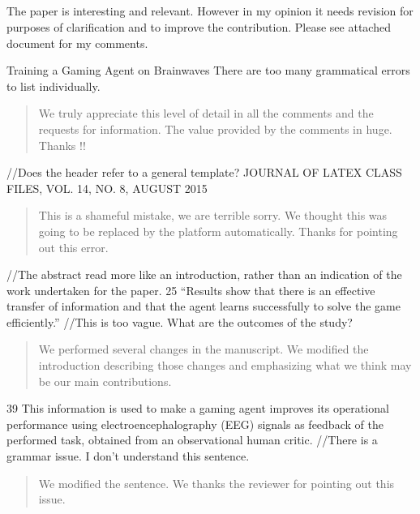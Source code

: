 \documentclass[journal,onecolumn,12pt]{IEEEtran}
\begin{document}
\subsection*{}
The paper is interesting and relevant. However in my opinion it needs revision for purposes of clarification and to improve the contribution.
Please see attached document for my comments.

Training a Gaming Agent on Brainwaves
There are too many grammatical errors to list individually.

\begin{quotation}
{\color{blue}
We truly appreciate this level of detail in all the comments and the requests for information.  The value provided by the comments in huge.  Thanks !!
}
\end{quotation}


//Does the header refer to a general template?
JOURNAL OF LATEX CLASS FILES, VOL. 14, NO. 8, AUGUST 2015

\begin{quotation}
{\color{blue}
This is a shameful mistake, we are terrible sorry.  We thought this was going to be replaced by the platform automatically. Thanks for pointing out this error.
}
\end{quotation}

//The abstract read more like an introduction, rather than an indication of the work undertaken for the paper.
25 “Results show that there is an effective transfer of information and that
the agent learns successfully to solve the game efficiently.”
//This is too vague. What are the outcomes of the study?

\begin{quotation}
{\color{blue}
We performed several changes in the manuscript.  We modified the introduction describing those changes and emphasizing what we think may be our main contributions.
}
\end{quotation}

39 This information is used to make a gaming agent improves its operational performance using electroencephalography (EEG) signals as feedback of the performed task, obtained from an observational human critic.
//There is a grammar issue. I don’t understand this sentence.

\begin{quotation}
{\color{blue}
We modified the sentence.  We thanks the reviewer for pointing out this issue.
}
\end{quotation}
\end{document}
